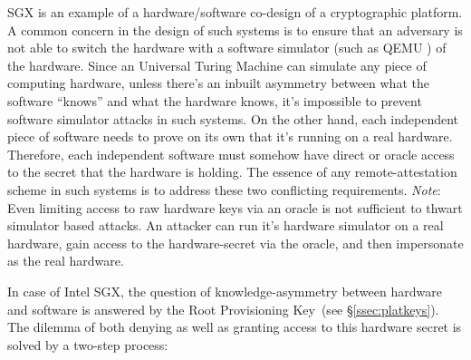 \documentclass[letterpaper]{article}
\newcommand{\secref}[1]{\S\ref{#1}}
\newcommand{\rpk}{\textsf{Root Provisioning Key}}
\begin{document}
  SGX is an example of a hardware/software co-design of a
  cryptographic platform. A common concern in the design of such
  systems is to ensure that an adversary is not able to switch the
  hardware with a software simulator (such as QEMU \cite{qemu,
    opensgx}) of the hardware. Since an Universal Turing Machine can
  simulate any piece of computing hardware, unless there's an inbuilt
  asymmetry between what the software ``knows'' and what the hardware
  knows, it's impossible to prevent software simulator attacks in such
  systems. On the other hand, each independent piece of software needs
  to prove on its own that it's running on a real hardware.
  Therefore, each independent software must somehow have direct or
  oracle access to the secret that the hardware is holding. The
  essence of any remote-attestation scheme in such systems is to
  address these two conflicting requirements. {\em Note}: Even
  limiting access to raw hardware keys via an oracle is not sufficient
  to thwart simulator based attacks. An attacker can run it's hardware
  simulator on a real hardware, gain access to the hardware-secret via
  the oracle, and then impersonate as the real hardware.

  In case of Intel SGX, the question of knowledge-asymmetry between
  hardware and software is answered by the \rpk\ (see
  \secref{ssec:platkeys}). The dilemma of both denying as well as
  granting access to this hardware secret is solved by a two-step
  process:
\end{document}
